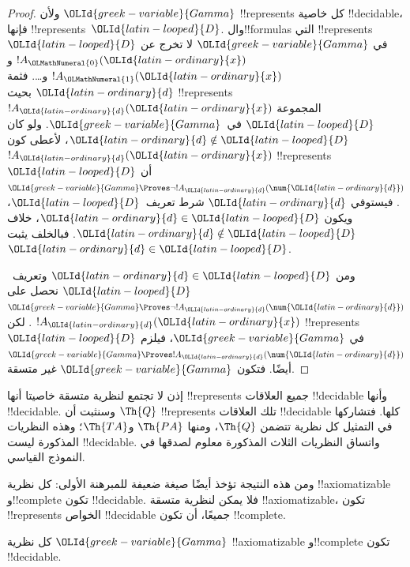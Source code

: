 \documentclass[../../../include/open-logic-section]{subfiles}
\begin{document}
\begin{proof}
ولأن $\OLId{greek-variable}{Gamma}$ !!{represents} كل خاصية
!!{decidable}، فإنها !!{represents}~$\OLId{latin-looped}{D}$.
وال!!{formula}s التي !!{represents}~$\OLId{latin-looped}{D}$
في $\OLId{greek-variable}{Gamma}$ لا تخرج عن $!A_\OLMathNumeral{0}(\OLId{latin-ordinary}{x})$ و$!A_\OLMathNumeral{1}(\OLId{latin-ordinary}{x})$
و\dots. فثمة $\OLId{latin-ordinary}{d}$ بحيث !!{represents}
$!A_\OLId{latin-ordinary}{d}(\OLId{latin-ordinary}{x})$ المجموعة $\OLId{latin-looped}{D}$ في~$\OLId{greek-variable}{Gamma}$.
ولو كان $\OLId{latin-ordinary}{d}\notin \OLId{latin-looped}{D}$، لأعطى كون $!A_\OLId{latin-ordinary}{d}(\OLId{latin-ordinary}{x})$
!!{represents}~$\OLId{latin-looped}{D}$ أن
$\OLId{greek-variable}{Gamma}\Proves\lnot !A_\OLId{latin-ordinary}{d}(\num{\OLId{latin-ordinary}{d}})$.
فيستوفي $\OLId{latin-ordinary}{d}$ شرط تعريف~$\OLId{latin-looped}{D}$، ويكون $\OLId{latin-ordinary}{d}\in \OLId{latin-looped}{D}$،
خلاف $\OLId{latin-ordinary}{d}\notin \OLId{latin-looped}{D}$. فبالخلف يثبت $\OLId{latin-ordinary}{d}\in \OLId{latin-looped}{D}$.

ومن $\OLId{latin-ordinary}{d}\in \OLId{latin-looped}{D}$ وتعريف~$\OLId{latin-looped}{D}$ نحصل على
$\OLId{greek-variable}{Gamma}\Proves\lnot !A_\OLId{latin-ordinary}{d}(\num{\OLId{latin-ordinary}{d}})$.
لكن $!A_\OLId{latin-ordinary}{d}(\OLId{latin-ordinary}{x})$ !!{represents}~$\OLId{latin-looped}{D}$ في $\OLId{greek-variable}{Gamma}$،
فيلزم $\OLId{greek-variable}{Gamma}\Proves !A_\OLId{latin-ordinary}{d}(\num{\OLId{latin-ordinary}{d}})$ أيضًا.
فتكون $\OLId{greek-variable}{Gamma}$ غير متسقة.
\end{proof}

\begin{explain}
إذن لا تجتمع لنظرية متسقة خاصيتا أنها
!!{represents} جميع العلاقات !!{decidable}
وأنها !!{decidable}. وسنثبت أن $\Th{Q}$
!!{represents} تلك العلاقات !!{decidable} كلها.
فتشاركها في التمثيل كل نظرية تتضمن $\Th{Q}$،
ومنها $\Th{PA}$ و$\Th{TA}$؛ وهذه النظريات
المذكورة ليست !!{decidable}. واتساق النظريات
الثلاث المذكورة معلوم لصدقها في النموذج القياسي.

ومن هذه النتيجة تؤخذ أيضًا صيغة ضعيفة للمبرهنة
الأولى: كل نظرية !!{axiomatizable} و!!{complete}
تكون !!{decidable}. فلا يمكن لنظرية متسقة
!!{axiomatizable}، تكون !!{represents}
الخواص !!{decidable} جميعًا، أن تكون
!!{complete}.
\end{explain}

\begin{thm}
كل نظرية $\OLId{greek-variable}{Gamma}$ !!{axiomatizable}
و!!{complete} تكون !!{decidable}.
\end{thm}
\end{document}
